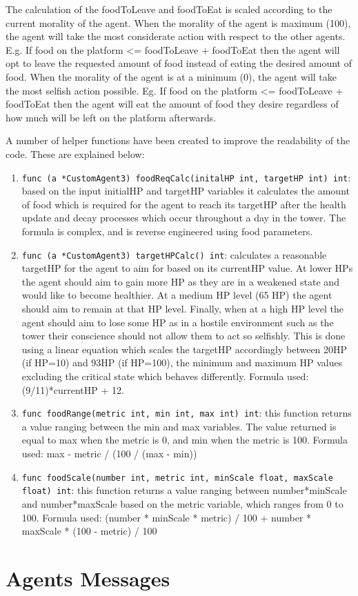 The calculation of the foodToLeave and foodToEat is scaled according to the current morality of the agent. When the morality of the agent is maximum (100), the agent will take the most considerate action with respect to the other agents. E.g. If food on the platform <= foodToLeave + foodToEat then the agent will opt to leave the requested amount of food instead of eating the desired amount of food. When the morality of the agent is at a minimum (0), the agent will take the most selfish action possible. Eg. If food on the platform <= foodToLeave + foodToEat then the agent will eat the amount of food they desire regardless of how much will be left on the platform afterwards.\par
A number of helper functions have been created to improve the readability of the code. These are explained below:
\begin{enumerate}
    \item \texttt{func (a *CustomAgent3) foodReqCalc(initalHP int, targetHP int) int}: based on the input initialHP and targetHP variables it calculates the amount of food which is required for the agent to reach its targetHP after the health update and decay processes which occur throughout a day in the tower. The formula is complex, and is reverse engineered using food parameters.
    \item \texttt{func (a *CustomAgent3) targetHPCalc() int}: calculates a reasonable targetHP for the agent to aim for based on its currentHP value. At lower HPs the agent should aim to gain more HP as they are in a weakened state and would like to become healthier. At a medium HP level (65 HP) the agent should aim to remain at that HP level. Finally, when at a high HP level the agent should aim to lose some HP as in a hostile environment such as the tower their conscience should not allow them to act so selfishly. This is done using a linear equation which scales the targetHP accordingly between 20HP (if HP=10) and 93HP (if HP=100), the minimum and maximum HP values excluding the critical state which behaves differently. Formula used: (9/11)*currentHP + 12.
    \item \texttt{func foodRange(metric int, min int, max int) int}: this function returns a value ranging between the min and max variables. The value returned is equal to max when the metric is 0, and min when the metric is 100. Formula used: max - metric / (100 / (max - min))
    \item \texttt{func foodScale(number int, metric int, minScale float, maxScale float) int}: this function returns a value ranging between number*minScale and number*maxScale based on the metric variable, which ranges from 0 to 100. Formula used: (number * minScale * metric) / 100 + number * maxScale * (100 - metric) / 100
\end{enumerate}

\section{Agents Messages}\label{agents_messages}